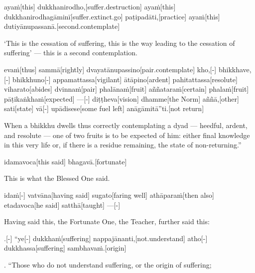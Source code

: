 \begin{samepage}
\begingl[glneveryline={\PaliGlossA,\PaliGlossB}]
ayaṁ[this] dukkhanirodho,[suffer.destruction] ayaṁ[this] dukkhanirodhagāminī[suffer.extinct.go] paṭipadāti,[practice] ayaṁ[this] dutiyānupassanā.[second.contemplate]
\endgl
\nopagebreak
\linespread{0.5}
\begin{spacin}{0.2}
{\PaliGlossFT ‘This is the cessation of suffering, this is the way leading to the cessation of suffering’ — this is a second contemplation.}
\end{spacin}
\vskip 12pt
\end{samepage}
\begin{samepage}
\begingl[glneveryline={\PaliGlossA,\PaliGlossB}]
evaṁ[thus] sammā[rightly] dvayatānupassino[pair.contemplate] kho,[-] bhikkhave,[-] bhikkhuno[-] appamattassa[vigilant] ātāpino[ardent] pahitattassa[resolute] viharato[abides] dvinnaṁ[pair] phalānaṁ[fruit] aññataraṁ[certain] phalaṁ[fruit] pāṭikaṅkhaṁ[expected] —[-] diṭṭheva[vision] dhamme[the Norm] aññā,[other] sati[state] vā[-] upādisese[some fuel left] anāgāmitā”ti.[not return]
\endgl
\nopagebreak
\linespread{0.5}
\begin{spacin}{0.2}
{\PaliGlossFT When a bhikkhu dwells thus correctly contemplating a dyad — heedful, ardent, and resolute — one of two fruits is to be expected of him: either final knowledge in this very life or, if there is a residue remaining, the state of non-returning.”}
\end{spacin}
\vskip 12pt
\end{samepage}
\begin{samepage}
\begingl[glneveryline={\PaliGlossA,\PaliGlossB}]
idamavoca[this said] bhagavā.[fortunate]
\endgl
\nopagebreak
\linespread{0.5}
\begin{spacin}{0.2}
{\PaliGlossFT This is what the Blessed One said.}
\end{spacin}
\vskip 12pt
\end{samepage}
\begin{samepage}
\begingl[glneveryline={\PaliGlossA,\PaliGlossB}]
idaṁ[-] vatvāna[having said] sugato[faring well] athāparaṁ[then also] etadavoca[he said] satthā[taught] —[-]
\endgl
\nopagebreak
\linespread{0.5}
\begin{spacin}{0.2}
{\PaliGlossFT Having said this, the Fortunate One, the Teacher, further said this:}
\end{spacin}
\vskip 12pt
\end{samepage}
\vskip 0.2in
\begin{samepage}
.[-] “ye[-] dukkhaṁ[suffering] nappajānanti,[not.understand] atho[-] dukkhassa[suffering] sambhavaṁ.[origin]
\endgl
\nopagebreak
\linespread{0.5}
\begin{spacin}{0.2}
{. “Those who do not understand suffering,  or the origin of suffering;}
\end{spacin}
\vskip 12pt
\end{samepage}
